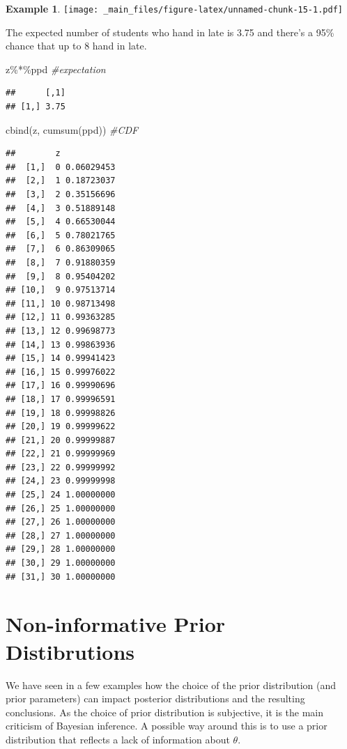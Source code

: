 \documentclass[
]{book}
\newenvironment{Shaded}{\begin{snugshade}}{\end{snugshade}}
\newcommand{\CommentTok}[1]{\textcolor[rgb]{0.56,0.35,0.01}{\textit{#1}}}
\newcommand{\FunctionTok}[1]{\textcolor[rgb]{0.00,0.00,0.00}{#1}}
\newcommand{\NormalTok}[1]{#1}
\newcommand{\SpecialCharTok}[1]{\textcolor[rgb]{0.00,0.00,0.00}{#1}}
\theoremstyle{definition}
\theoremstyle{definition}
\newtheorem{example}{Example}[chapter]
\theoremstyle{definition}
\theoremstyle{definition}
\theoremstyle{remark}
\begin{document}
\begin{example}
\texttt{[image: \_main\_files/figure-latex/unnamed-chunk-15-1.pdf]}

The expected number of students who hand in late is 3.75 and there's a 95\% chance that up to 8 hand in late.

\begin{Shaded}
\begin{Highlighting}[]
\NormalTok{z}\SpecialCharTok{\%*\%}\NormalTok{ppd }\CommentTok{\#expectation}
\end{Highlighting}
\end{Shaded}

\begin{verbatim}
##      [,1]
## [1,] 3.75
\end{verbatim}

\begin{Shaded}
\begin{Highlighting}[]
\FunctionTok{cbind}\NormalTok{(z, }\FunctionTok{cumsum}\NormalTok{(ppd)) }\CommentTok{\#CDF}
\end{Highlighting}
\end{Shaded}

\begin{verbatim}
##        z           
##  [1,]  0 0.06029453
##  [2,]  1 0.18723037
##  [3,]  2 0.35156696
##  [4,]  3 0.51889148
##  [5,]  4 0.66530044
##  [6,]  5 0.78021765
##  [7,]  6 0.86309065
##  [8,]  7 0.91880359
##  [9,]  8 0.95404202
## [10,]  9 0.97513714
## [11,] 10 0.98713498
## [12,] 11 0.99363285
## [13,] 12 0.99698773
## [14,] 13 0.99863936
## [15,] 14 0.99941423
## [16,] 15 0.99976022
## [17,] 16 0.99990696
## [18,] 17 0.99996591
## [19,] 18 0.99998826
## [20,] 19 0.99999622
## [21,] 20 0.99999887
## [22,] 21 0.99999969
## [23,] 22 0.99999992
## [24,] 23 0.99999998
## [25,] 24 1.00000000
## [26,] 25 1.00000000
## [27,] 26 1.00000000
## [28,] 27 1.00000000
## [29,] 28 1.00000000
## [30,] 29 1.00000000
## [31,] 30 1.00000000
\end{verbatim}

\end{example}

\hypertarget{non-informative-prior-distibrutions}{%
\section{Non-informative Prior Distibrutions}\label{non-informative-prior-distibrutions}}

We have seen in a few examples how the choice of the prior distribution (and prior parameters) can impact posterior distributions and the resulting conclusions. As the choice of prior distribution is subjective, it is the main criticism of Bayesian inference. A possible way around this is to use a prior distribution that reflects a lack of information about \(\theta\).
\end{document}
